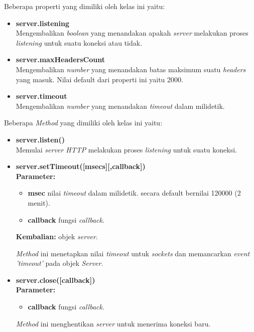 \begin{enumerate}
\begin{itemize}
	\end{itemize}

	Beberapa properti yang dimiliki oleh kelas ini yaitu:
	\begin{itemize}
		\item \textbf{server.listening} \\ Mengembalikan \textit{boolean} yang menandakan apakah \textit{server} melakukan proses \textit{listening} untuk suatu koneksi atau tidak.
		
		\item \textbf{server.maxHeadersCount} \\ Mengembalikan \textit{number} yang menandakan batas maksimum suatu \textit{headers} yang masuk. Nilai default dari properti ini yaitu 2000.
		
		\item \textbf{server.timeout} \\ Mengembalikan \textit{number} yang menandakan \textit{timeout} dalam milidetik.
	\end{itemize}
	
	Beberapa \textit{Method} yang dimiliki oleh kelas ini yaitu:
	\begin{itemize}
		\item \textbf{server.listen()} \\ Memulai \textit{server HTTP} melakukan proses \textit{listening} untuk suatu koneksi.
		
		\item \textbf{server.setTimeout([msecs][,callback])} \\ \textbf{Parameter:}
		\begin{itemize}
			\item \textbf{msec} nilai \textit{timeout} dalam milidetik. secara default bernilai 120000 (2 menit).
			\item \textbf{callback} fungsi \textit{callback}.
		\end{itemize}
		\textbf{Kembalian:} objek \textit{server}.
	
		\textit{Method} ini menetapkan nilai \textit{timeout} untuk \textit{sockets} dan memancarkan \textit{event 'timeout'} pada objek \textit{Server}.
		
		\item \textbf{server.close([callback])} \\ \textbf{Parameter:}
		\begin{itemize}
			\item \textbf{callback} fungsi \textit{callback}.
		\end{itemize} 
		
		\textit{Method} ini menghentikan \textit{server} untuk menerima koneksi baru.
	\end{itemize}
\end{enumerate} 

